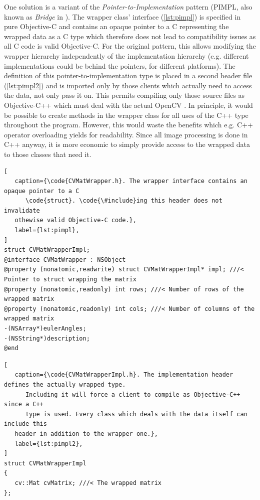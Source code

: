 One solution is a variant of the \emph{Pointer-to-Implementation} pattern
(PIMPL, also known as \emph{Bridge} in \citep{gamma1995}). The wrapper class'
interface (\autoref{lst:pimpl}) is specified in pure Objective-C and contains an
opaque pointer to a C  representing the wrapped data as a C type
which therefore does not lead to compatibility issues as all C code is valid
Objective-C. For the original pattern, this allows modifying the wrapper
hierarchy independently of the implementation hierarchy (e.g. different
implementations could be behind the pointers, for different platforms). The
definition of this pointer-to-implementation type is placed in a second header
file (\autoref{lst:pimpl2}) and is imported only by those clients which actually
need to access the data, not only pass it on. This permits compiling only those
source files as Objective-C++ which must deal with the actual OpenCV .
In principle, it would be possible to create methods in the wrapper class for
all uses of the C++ type throughout the program. However, this would waste the
benefits which e.g. C++ operator overloading yields for readability. Since all
image processing is done in C++ anyway, it is more economic to simply provide
access to the wrapped data to those classes that need it.

\lstset{
   language=[Objective]C,
   float,
}

\begin{lstlisting}[
   caption={\code{CVMatWrapper.h}. The wrapper interface contains an opaque pointer to a C
      \code{struct}. \code{\#include}ing this header does not invalidate
   othewise valid Objective-C code.},
   label={lst:pimpl},
]
struct CVMatWrapperImpl;
@interface CVMatWrapper : NSObject
@property (nonatomic,readwrite) struct CVMatWrapperImpl* impl; ///< Pointer to struct wrapping the matrix
@property (nonatomic,readonly) int rows; ///< Number of rows of the wrapped matrix
@property (nonatomic,readonly) int cols; ///< Number of columns of the wrapped matrix
-(NSArray*)eulerAngles;
-(NSString*)description;
@end
\end{lstlisting}

\begin{lstlisting}[
   caption={\code{CVMatWrapperImpl.h}. The implementation header defines the actually wrapped type.
      Including it will force a client to compile as Objective-C++ since a C++
      type is used. Every class which deals with the data itself can include this
   header in addition to the wrapper one.},
   label={lst:pimpl2},
]
struct CVMatWrapperImpl
{
   cv::Mat cvMatrix; ///< The wrapped matrix
};
\end{lstlisting}

